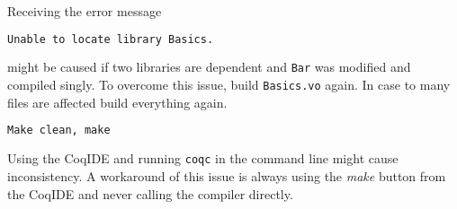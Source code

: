 Receiving the error message 
\begin{lstlisting}[language = bash, caption= possible compiling error, label=lst:PossibleCompilingError]
Unable to locate library Basics.
\end{lstlisting}
might be caused if two libraries are dependent and \texttt{Bar} was modified and compiled singly.
To overcome this issue, build \texttt{Basics.vo} again.
In case to many files are affected build everything again.
\begin{lstlisting}[language=bash, caption = rebuilding libraries, label = lst:RebuildingLibraries]
Make clean, make
\end{lstlisting}

Using the CoqIDE and running \texttt{coqc} in the command line might cause inconsistency. 
A workaround of this issue is always using the {\itshape make} button from the CoqIDE and never calling the compiler directly.
